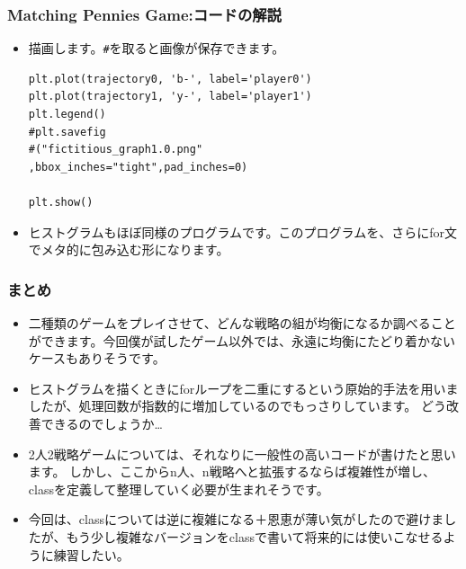 \documentclass[dvipdfmx,fleqn]{beamer}
\begin{document}
\begin{frame}[containsverbatim]%
\frametitle{Matching Pennies Game:コードの解説}
\begin{itemize}\setlength{\parskip}{0.5em}
\item
描画します。\verb!#!を取ると画像が保存できます。
\begin{verbatim}
plt.plot(trajectory0, 'b-', label='player0')  
plt.plot(trajectory1, 'y-', label='player1')  
plt.legend()
#plt.savefig
#("fictitious_graph1.0.png"
,bbox_inches="tight",pad_inches=0)

plt.show()

\end{verbatim}
\item
ヒストグラムもほぼ同様のプログラムです。このプログラムを、さらにfor文でメタ的に包み込む形になります。

\end{itemize}
\end{frame}

\begin{frame}
\frametitle{まとめ}
\begin{itemize}\setlength{\parskip}{0.5em}
\item
二種類のゲームをプレイさせて、どんな戦略の組が均衡になるか調べることができます。今回僕が試したゲーム以外では、永遠に均衡にたどり着かないケースもありそうです。

\item
ヒストグラムを描くときにforループを二重にするという原始的手法を用いましたが、処理回数が指数的に増加しているのでもっさりしています。
どう改善できるのでしょうか…
\item
2人2戦略ゲームについては、それなりに一般性の高いコードが書けたと思います。
しかし、ここからn人、n戦略へと拡張するならば複雑性が増し、classを定義して整理していく必要が生まれそうです。
\item
今回は、classについては逆に複雑になる＋恩恵が薄い気がしたので避けましたが、もう少し複雑なバージョンをclassで書いて将来的には使いこなせるように練習したい。
\end{itemize}
\end{frame}
\end{document}
